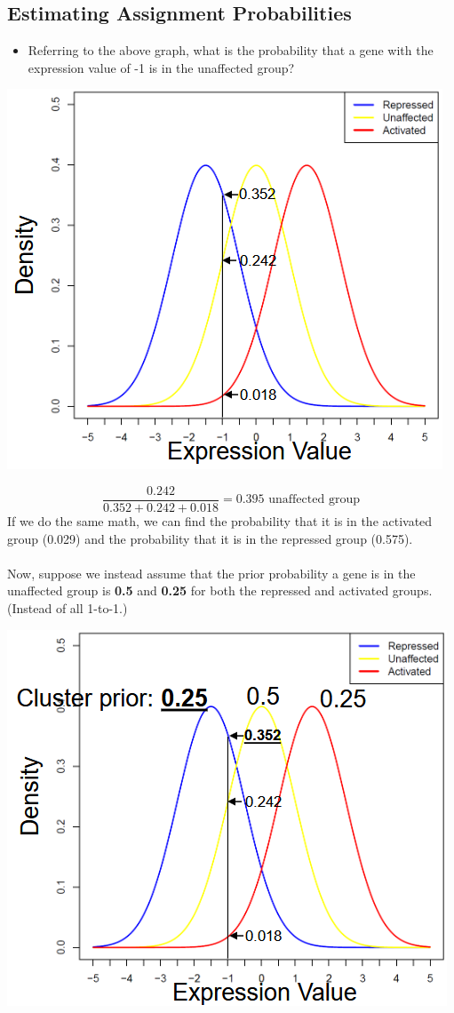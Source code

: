 \documentclass[10pt]{article}
\begin{document}
\subsection*{Estimating Assignment Probabilities}
\begin{itemize}
    \item Referring to the above graph, what is the probability that a gene with the expression value of -1 is in the unaffected group?
\end{itemize}
\begin{center}
    \includegraphics*[scale=0.7]{W6_31.png}
\end{center}
\[\frac{0.242}{0.352 + 0.242 + 0.018} = \boxed{0.395 \text{ unaffected group}}\]
If we do the same math, we can find the probability that it is in the activated group (0.029) and the probability that it is in the repressed group (0.575).\\\\
Now, suppose we instead assume that the prior probability a gene is in the unaffected group is \textbf{0.5} and \textbf{0.25} for both the repressed and activated groups.  (Instead of all 1-to-1.)
\begin{center}
    \includegraphics*[scale=0.7]{W6_32.png}
\end{center}
\end{document}
